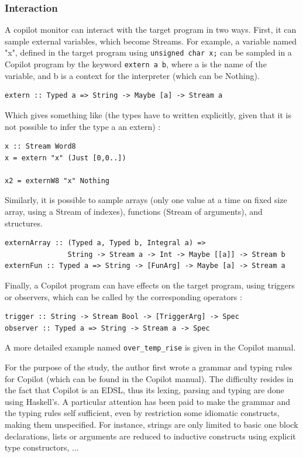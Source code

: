 \documentclass[a4paper,11pt,final]{article}
\begin{document}
	\subsubsection{Interaction}
	A copilot monitor can interact with the target program in two ways. First, it can sample external variables, which become Streams. For example, a variable named "x", defined in the target program using \texttt{unsigned char x;} can be sampled in a Copilot program by the keyword \texttt{extern a b}, where a is the name of the variable, and b is a context for the interpreter (which can be Nothing).
\begin{verbatim}
extern :: Typed a => String -> Maybe [a] -> Stream a
\end{verbatim}
	
	Which gives something like (the types have to written explicitly, given that it is not possible to infer the type a an extern) :
	
\begin{verbatim}
x :: Stream Word8
x = extern "x" (Just [0,0..])

x2 = externW8 "x" Nothing
\end{verbatim}
	
	Similarly, it is possible to sample arrays (only one value at a time on fixed size array, using a Stream of indexes), functions (Stream of arguments), and structures.
	
	\begin{verbatim}
externArray :: (Typed a, Typed b, Integral a) => 
               String -> Stream a -> Int -> Maybe [[a]] -> Stream b
externFun :: Typed a => String -> [FunArg] -> Maybe [a] -> Stream a
\end{verbatim}
	
	Finally, a Copilot program can have effects on the target program, using triggers or observers, which can be called by the corresponding operators :
	
\begin{verbatim}
trigger :: String -> Stream Bool -> [TriggerArg] -> Spec
observer :: Typed a => String -> Stream a -> Spec
\end{verbatim}
	
	A more detailed example named \texttt{over\_temp\_rise} is given in the Copilot manual\cite{Copilot07}. 
	
	For the purpose of the study, the author first wrote a grammar and typing rules for Copilot (which can be found in the Copilot manual\cite{Copilot08}). The difficulty resides in the fact that Copilot is an EDSL, thus its lexing, parsing and typing are done using Haskell's. A particular attention has been paid to make the grammar and the typing rules self sufficient, even by restriction some idiomatic constructs, making them unspecified. For instance, strings are only limited to basic one block declarations, lists or arguments are reduced to inductive constructs using explicit type constructors, ...
	
\end{document}
